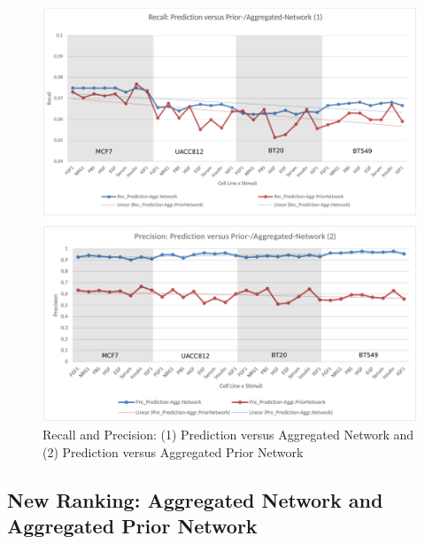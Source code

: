 \begin{figure}[H]
\centering
\includegraphics[width=1.0\textwidth]{./Bilder/Scoring/dreamchallenge/1_Balanced_vs_Unbalanced/balanced_rec_prec.pdf}
\caption[Recall and Precision: Prediction versus Aggregated/Prior Network]{Recall and Precision: (1) Prediction versus Aggregated Network and (2) Prediction versus Aggregated Prior Network}
\label{fig:10}
\end{figure}

\subsection*{New Ranking: Aggregated Network and Aggregated Prior Network}

